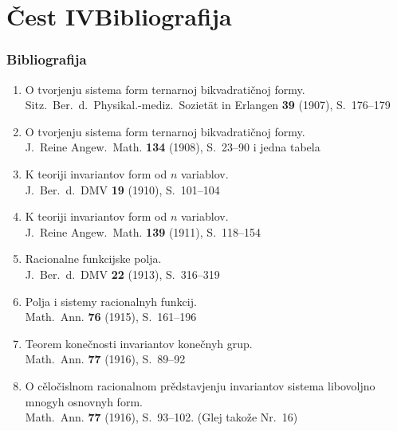 \documentclass[11pt]{article}
\newcommand{\foreign}[1]{#1}
\begin{document}
\part*{Čest IV\hspace{1em}Bibliografija}

\section*{Bibliografija}

\begin{enumerate}[label={\small\arabic*.},leftmargin=2em,itemsep=0.3em]
\item O tvorjenju sistema form ternarnoj bikvadratičnoj formy.\\
\foreign{Sitz.\ Ber.\ d.\ Physikal.-mediz.\ Sozietät in Erlangen} \textbf{39} (1907), S.~176--179

\item O tvorjenju sistema form ternarnoj bikvadratičnoj formy.\\
\foreign{J.\ Reine Angew.\ Math.} \textbf{134} (1908), S.~23--90 i jedna tabela

\item K teoriji invariantov form od $n$ variablov.\\
\foreign{J.\ Ber.\ d.\ DMV} \textbf{19} (1910), S.~101--104

\item K teoriji invariantov form od $n$ variablov.\\
\foreign{J.\ Reine Angew.\ Math.} \textbf{139} (1911), S.~118--154

\item Racionalne funkcijske polja.\\
\foreign{J.\ Ber.\ d.\ DMV} \textbf{22} (1913), S.~316--319

\item Polja i sistemy racionalnyh funkcij.\\
\foreign{Math.\ Ann.} \textbf{76} (1915), S.~161--196

\item Teorem konečnosti invariantov konečnyh grup.\\
\foreign{Math.\ Ann.} \textbf{77} (1916), S.~89--92

\item O cěločislnom racionalnom prědstavjenju invariantov sistema libovoljno mnogyh osnovnyh form.\\
\foreign{Math.\ Ann.} \textbf{77} (1916), S.~93--102. (Glej takože Nr.~16)


\end{enumerate}
\end{document}
